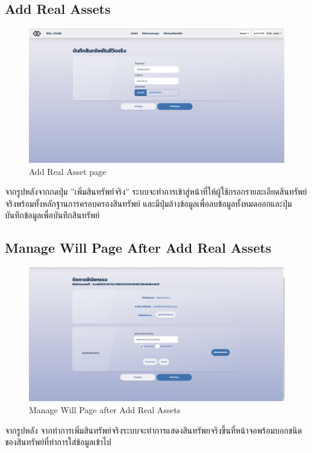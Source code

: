 \documentclass[12pt,oneside,openright,a4paper]{cpe-thai-project}
\begin{document}
\subsection{Add Real Assets }
	\begin{figure}[!thb]
			\centering
			\includegraphics[scale=0.2]{Addwillpage}
			\caption{Add Real Asset page}
		\end{figure}
		\FloatBarrier
\tab จากรูปหลังจากกดปุ่ม ''เพิ่มสินทรัพย์จริง'' ระบบจะทำการเข้าสู่หน้าที่ให้ผู้ใช้กรอกรายละเอียดสินทรัพย์จริงพร้อมทั้งหลักฐานการครอบครองสินทรัพย์ และมีปุ่มล้างข้อมูลเพื่อลบข้อมูลทั้งหมดออกและปุ่มบันทึกข้อมูลเพื่อบันทึกสินทรัพย์

\subsection{Manage Will Page After Add Real Assets }
	\begin{figure}[!thb]
			\centering
			\includegraphics[scale=0.2]{manageWillRealAsset4}
			\caption{Manage Will Page after Add Real Assets }
		\end{figure}
		\FloatBarrier
\tab จากรูปหลัง จากทำการเพิ่มสินทรัพย์จริงระบบจะทำการแสดงสินทรัพยจริงขึ้นที่หน้าจอพร้อมบอกชนิดของสินทรัพย์ที่ทำการใส่ข้อมูลเข้าไป
\end{document}
